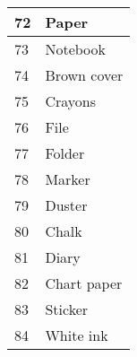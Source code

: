 \begin{longtable}{|l|l|}
		\hline
		72 & Paper\\
		\hline
		73 & Notebook\\
		\hline
		74 & Brown cover\\
		\hline
		75 & Crayons\\
		\hline
		76 & File\\
		\hline
		77 & Folder\\
		\hline
		78 & Marker\\
		\hline
		79 & Duster\\
		\hline
		80 & Chalk\\
		\hline
		81 & Diary\\
		\hline
		82 & Chart paper\\
		\hline
		83 & Sticker\\
		\hline
		84 & White ink\\
		\hline
	\end{longtable}
